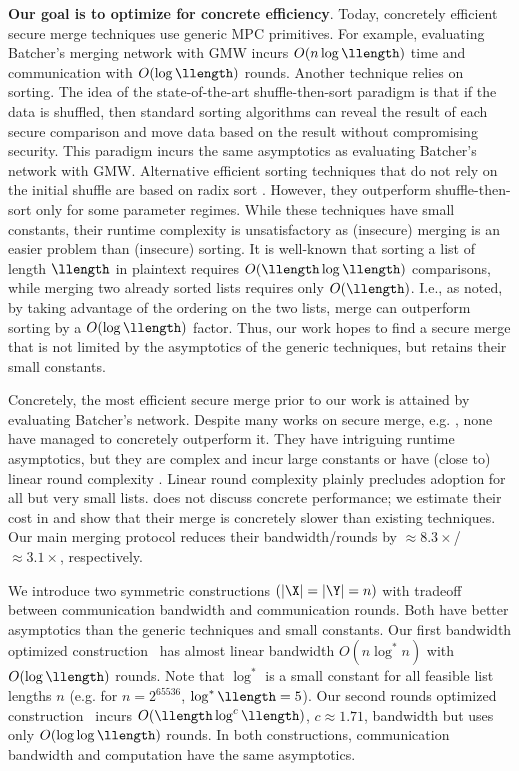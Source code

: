 \noindent 
\textbf{Our goal is to optimize for concrete efficiency}.
Today, concretely efficient secure merge techniques use generic MPC primitives.
For example, evaluating Batcher's merging network \cite{AFIPS:Bat68} with GMW incurs $O(n\log\llength)$ time and communication with $O(\log\llength)$ rounds.
Another technique relies on sorting. The idea of the state-of-the-art shuffle-then-sort paradigm \cite{ICISC:HKICT12} is that if the data is shuffled, then standard sorting
algorithms can reveal the result of each secure comparison and move data based on the result without compromising security. This paradigm incurs the same asymptotics as evaluating Batcher's network with GMW.  Alternative efficient sorting techniques that do not rely on the initial shuffle are based on radix sort \cite{EPRINT:HICT14,EPRINT:CHIKKP19}. However, they outperform shuffle-then-sort only for some parameter regimes. 
While these techniques have small constants, their runtime complexity is unsatisfactory as (insecure) merging is an easier problem than (insecure) sorting.
It is well-known that sorting a list of length $\llength$ in plaintext requires $O(\llength\log\llength)$ comparisons, while merging two already sorted lists requires only $O(\llength)$.
I.e., as \cite{EPRINT:BBDLO22} noted, by taking advantage of the ordering on the two lists, merge can outperform sorting by a $O(\log\llength)$ factor. Thus, our work hopes to find a secure merge that is not limited by the asymptotics of the generic techniques, but retains their small constants.

Concretely, the most efficient secure merge prior to our work is attained by evaluating Batcher's network.
Despite many works on secure merge, e.g. \cite{ITC:FalOst21,CSCML:FalNemOst22,EPRINT:BBDLO22}, none have managed to concretely outperform it.
They have intriguing runtime asymptotics, but they are complex and incur large constants \cite{EPRINT:BBDLO22} or have (close to) linear round complexity \cite{ITC:FalOst21,CSCML:FalNemOst22}. Linear round complexity plainly precludes adoption for all but very small lists. \cite{EPRINT:BBDLO22} does not discuss concrete performance; we estimate their cost in  and show that their merge is concretely slower than existing techniques. Our main merging protocol reduces their bandwidth/rounds by $\approx8.3\times$/$\approx3.1\times$, respectively. 

We introduce two symmetric constructions $(|\X|=|\Y|=n)$ with tradeoff between communication bandwidth and communication rounds. Both have better asymptotics than the generic techniques and small constants. Our first bandwidth optimized construction \ourapproach\ has almost linear bandwidth $O(n \log^* n)$ with $O(\log\llength)$ rounds. Note that $\log^*$ is a small constant for all feasible list lengths $n$ (e.g. for $n = 2^{65536}$, $\log^*\llength = 5$). Our second rounds optimized construction \ourapproachtwo\ incurs $O(\llength\log^c\llength)$, $c \approx1.71$, bandwidth but uses only $O(\log\log\llength)$ rounds. In both constructions, communication bandwidth and computation have the same asymptotics.

